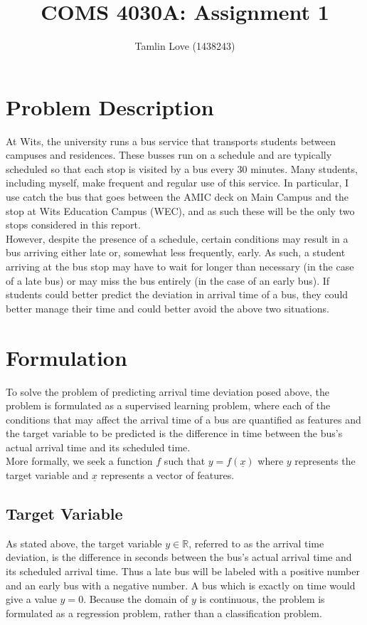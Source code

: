 \documentclass[11pt]{extarticle}
\title{\vspace{-2cm}COMS 4030A: Assignment 1}
\author{Tamlin Love (1438243)}
\date{}
\begin{document}
\maketitle

\section{Problem Description}
At Wits, the university runs a bus service that transports students between campuses and residences. These busses run on a schedule and are typically scheduled so that each stop is visited by a bus every 30 minutes. Many students, including myself, make frequent and regular use of this service. In particular, I use catch the bus that goes between the AMIC deck on Main Campus and the stop at Wits Education Campus (WEC), and as such these will be the only two stops considered in this report.
\\
However, despite the presence of a schedule, certain conditions may result in a bus arriving either late or, somewhat less frequently, early. As such, a student arriving at the bus stop may have to wait for longer than necessary (in the case of a late bus) or may miss the bus entirely (in the case of an early bus). If students could better predict the deviation in arrival time of a bus, they could better manage their time and could better avoid the above two situations.
\section{Formulation}
To solve the problem of predicting arrival time deviation posed above, the problem is formulated as a supervised learning problem, where each of the conditions that may affect the arrival time of a bus are quantified as features and the target variable to be predicted is the difference in time between the bus's actual arrival time and its scheduled time.
\\
More formally, we seek a function $f$ such that $y = f(\underline{x})$ where $y$ represents the target variable and $\underline{x}$ represents a vector of features.
\subsection{Target Variable}
As stated above, the target variable $y \in \mathbb{R}$, referred to as the arrival time deviation, is the difference in seconds between the bus's actual arrival time and its scheduled arrival time\cite{kalaputapu94}. Thus a late bus will be labeled with a positive number and an early bus with a negative number. A bus which is exactly on time would give a value $y = 0$. Because the domain of $y$ is continuous, the problem is formulated as a regression problem, rather than a classification problem.
\end{document}

